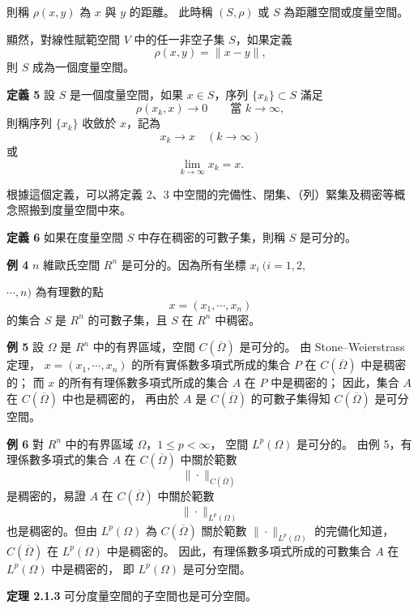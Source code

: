 \documentclass[11pt,a4paper,twoside]{article}
\newcommand{\pnum}[1]{%
    \makebox[0pt][r]{%
        \scriptsize\textbf{[#1]}\hspace{0.7em}%
    }%
}
\begin{document}
則稱 $\rho(x,y)$ 為 $x$ 與 $y$ 的距離。
此時稱 $(S,\rho)$ 或 $S$ 為距離空間或度量空間。

\noindent
\pnum{57}
顯然，對線性賦範空間 $V$ 中的任一非空子集 $S$，如果定義
\[
    \rho(x,y)=\|x-y\|,
\]
則 $S$ 成為一個度量空間。

\noindent
\pnum{58}
\textbf{定義 5}\quad
設 $S$ 是一個度量空間，如果 $x\in S$，序列
$\{x_k\}\subset S$ 滿足
\[
    \rho(x_k,x)\longrightarrow 0
    \qquad
    \text{當 }k\to\infty,
\]
則稱序列 $\{x_k\}$ 收斂於 $x$，記為
\[
    x_k\to x\quad(k\to\infty)
\]
或
\[
    \lim_{k\to\infty}x_k=x.
\]

根據這個定義，可以將定義 2、3 中空間的完備性、閉集、（列）緊集及稠密等概念照搬到度量空間中來。

\noindent
\pnum{59}
\textbf{定義 6}\quad
如果在度量空間 $S$ 中存在稠密的可數子集，則稱 $S$ 是可分的。

\noindent
\pnum{60}
\textbf{例 4}\quad
$n$ 維歐氏空間 $R^n$ 是可分的。因為所有坐標
$x_i\ (i=1,2,$

\newpage

\noindent
\pnum{61}
$\cdots,n)$ 為有理數的點
\[
    x=(x_1,\cdots,x_n)
\]
的集合 $S$ 是 $R^n$ 的可數子集，且 $S$ 在 $R^n$ 中稠密。

\noindent
\pnum{62}
\textbf{例 5}\quad
設 $\Omega$ 是 $R^n$ 中的有界區域，空間
$C(\overline{\Omega})$ 是可分的。
由 Stone--Weierstrass 定理，
$x=(x_1,\cdots,x_n)$ 的所有實係數多項式所成的集合 $P$
在 $C(\overline{\Omega})$ 中是稠密的；
而 $x$ 的所有有理係數多項式所成的集合 $A$ 在 $P$ 中是稠密的；
因此，集合 $A$ 在 $C(\overline{\Omega})$ 中也是稠密的，
再由於 $A$ 是 $C(\overline{\Omega})$ 的可數子集得知
$C(\overline{\Omega})$ 是可分空間。

\noindent
\pnum{63}
\textbf{例 6}\quad
對 $R^n$ 中的有界區域 $\Omega$，$1\le p<\infty$，
空間 $L^p(\Omega)$ 是可分的。
由例 5，有理係數多項式的集合 $A$ 在 $C(\overline{\Omega})$
中關於範數
\[
    \|\cdot\|_{C(\overline{\Omega})}
\]
是稠密的，易證 $A$ 在 $C(\overline{\Omega})$ 中關於範數
\[
    \|\cdot\|_{L^p(\Omega)}
\]
也是稠密的。但由 $L^p(\Omega)$ 為 $C(\overline{\Omega})$
關於範數 $\|\cdot\|_{L^p(\Omega)}$ 的完備化知道，
$C(\overline{\Omega})$ 在 $L^p(\Omega)$ 中是稠密的。
因此，有理係數多項式所成的可數集合 $A$ 在 $L^p(\Omega)$ 中是稠密的，
即 $L^p(\Omega)$ 是可分空間。

\noindent
\pnum{64}
\textbf{定理 2.1.3}\quad
可分度量空間的子空間也是可分空間。
\end{document}
